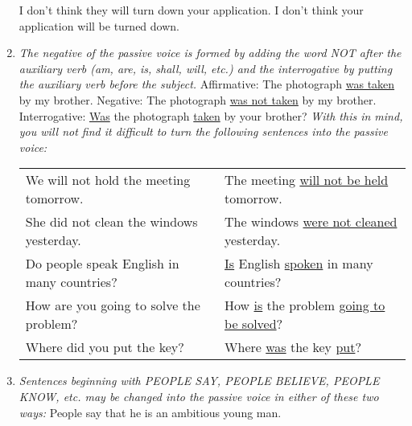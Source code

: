 \begin{enumerate}
        I don't think they will turn down your application.
        \newline
        I don't think your application will be turned down.
    \item
        {\it
        The negative of the passive voice is formed by adding the word NOT after
        the auxiliary verb (am, are, is, shall, will, etc.) and the
        interrogative by putting the auxiliary verb before the subject.
        }
        \newline
        \newline
        Affirmative: The photograph \underline{was taken} by my brother.
        \newline
        Negative: The photograph \underline{was not taken} by my brother.
        \newline
        Interrogative: \underline{Was} the photograph \underline{taken} by your brother?
        \newline
        \newline
        {\it
        With this in mind, you will not find it difficult to turn the following
        sentences into the passive voice:
        }
        \newline
        \newline
        \begin{tabular}{ll}
            We will not hold the meeting tomorrow.
            & The meeting \underline{will not be held} tomorrow. \\
            She did not clean the windows yesterday.
            & The windows \underline{were not cleaned} yesterday. \\
            Do people speak English in many countries?
            & \underline{Is} English \underline{spoken} in many countries? \\
            How are you going to solve the problem?
            & How \underline{is} the problem \underline{going to be solved}? \\
            Where did you put the key?
            & Where \underline{was} the key \underline{put}?
        \end{tabular}
    \item
        {\it
        Sentences beginning with PEOPLE SAY, PEOPLE BELIEVE, PEOPLE KNOW, etc.
        may be changed into the passive voice in either of these two ways:
        }
        \newline
        \newline
        People say that he is an ambitious young man.
        \newline

\end{enumerate}
